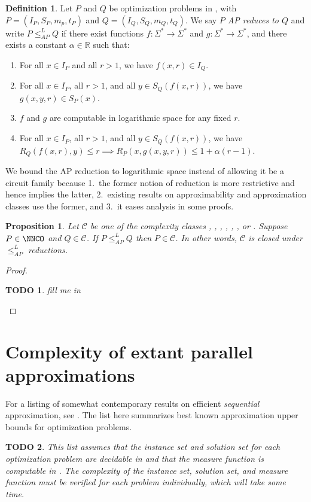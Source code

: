 \documentclass[]{article}
\theoremstyle{plain}
\newtheorem{proposition}{Proposition}
\newtheorem{todo}{TODO}
\theoremstyle{definition}
\newtheorem{definition}{Definition}
\newcommand{\APr}{\leq_{AP}^{L}}
\begin{document}
\begin{definition}{\cite[Definition~9]{ckst95}}
  Let $P$ and $Q$ be optimization problems in \NNCO, with $P=(I_P, S_P, m_p, t_P)$ and $Q=(I_Q, S_Q, m_Q, t_Q)$.
  We say \emph{$P$ AP reduces to $Q$} and write $P\APr Q$ if there exist functions $f\colon\Sigma^*\to\Sigma^*$ and $g\colon\Sigma^*\to\Sigma^*$, and there exists a constant $\alpha\in\mathbb{R}$ such that:
  \begin{enumerate}
  \item For all $x\in I_P$ and all $r > 1$, we have $f(x, r)\in I_Q$.
  \item For all $x\in I_P$, all $r > 1$, and all $y\in S_Q(f(x, r))$, we have $g(x, y, r)\in S_P(x)$.
  \item $f$ and $g$ are computable in logarithmic space for any fixed $r$.
  \item For all $x\in I_P$, all $r > 1$, and all $y\in S_Q(f(x, r))$, we have $R_Q(f(x, r), y) \leq r \implies R_P(x, g(x, y, r)) \leq 1 + \alpha(r - 1)$.
  \end{enumerate}
\end{definition}

We bound the AP reduction to logarithmic space instead of allowing it be a \FNC{} circuit family because 1.~the former notion of reduction is more restrictive and hence implies the latter, 2.~existing results on approximability and approximation classes use the former, and 3.~it eases analysis in some proofs.

\begin{proposition}
  Let $\mathcal{C}$ be one of the complexity classes \NCO, \NCAS, \ApxNCO, \logApxNCO, \polyApxNCO, \expApxNCO, or \NNCO.
  Suppose $P\in\NNCO$ and $Q\in\mathcal{C}$.
  If $P\APr Q$ then $P\in \mathcal{C}$.
  In other words, $\mathcal{C}$ is closed under $\APr$ reductions.
\end{proposition}
\begin{proof}
  \begin{todo}
    fill me in
  \end{todo}
\end{proof}

\section{Complexity of extant parallel approximations}

For a listing of somewhat contemporary results on efficient \emph{sequential} approximation, see \cite{compendium}.
The list here summarizes best known approximation upper bounds for optimization problems.
\begin{todo}
  This list \emph{assumes} that the instance set and solution set for each optimization problem are decidable in \NC{} and that the measure function is computable in \FNC{}.
  The complexity of the instance set, solution set, and measure function must be verified for each problem individually, which will take some time.
\end{todo}
\end{document}

